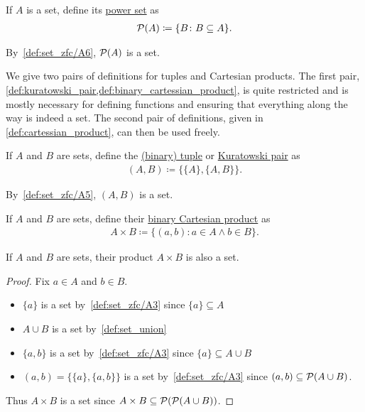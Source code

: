 \begin{definition}\label{def:power_set}\cite[4]{Lectures:general_topology}
  If $A$ is a set, define its \uline{power set} as
  \begin{align*}
    \operatorname{\mathcal P}(A) \coloneqq \{ B \colon B \subseteq A \}.
  \end{align*}

  By~\ref{def:set_zfc/A6}, $\operatorname{\mathcal P}(A)$ is a set.
\end{definition}

\begin{note}
  We give two pairs of definitions for tuples and Cartesian products. The first pair, \cref{def:kuratowski_pair,def:binary_cartessian_product}, is quite restricted and is mostly necessary for defining functions and ensuring that everything along the way is indeed a set. The second pair of definitions, given in \cref{def:cartessian_product}, can then be used freely.
\end{note}

\begin{definition}\label{def:kuratowski_pair}\cite[4]{Lectures:general_topology}
  If $A$ and $B$ are sets, define the \uline{(binary) tuple} or \uline{Kuratowski pair} as
  \begin{align*}
    (A, B) \coloneqq \{ \{ A \}, \{ A, B \} \}.
  \end{align*}

  By~\ref{def:set_zfc/A5}, $(A, B)$ is a set.
\end{definition}

\begin{definition}\label{def:binary_cartessian_product}\cite[4]{Lectures:general_topology}
  If $A$ and $B$ are sets, define their \uline{binary Cartesian product} as
  \begin{align*}
    A \times B \coloneqq \{ (a, b) \colon a \in A \land b \in B \}.
  \end{align*}
\end{definition}

\begin{proposition}
  If $A$ and $B$ are sets, their product $A \times B$ is also a set.
\end{proposition}
\begin{proof}
  Fix $a \in A$ and $b \in B$.
  \begin{itemize}
    \item $\{ a \}$ is a set by~\ref{def:set_zfc/A3} since $\{ a \} \subseteq A$
    \item $A \cup B$ is a set by~\cref{def:set_union}
    \item $\{ a, b \}$ is a set by~\ref{def:set_zfc/A3} since $\{ a \} \subseteq A \cup B$
    \item $(a, b) = \{ \{ a \}, \{ a, b \} \}$ is a set by~\ref{def:set_zfc/A3} since $(a, b) \subseteq \operatorname{\mathcal P}(A \cup B)$.
  \end{itemize}

  Thus $A \times B$ is a set since $A \times B \subseteq \operatorname{\mathcal P}(\operatorname{\mathcal P}(A \cup B))$.
\end{proof}

